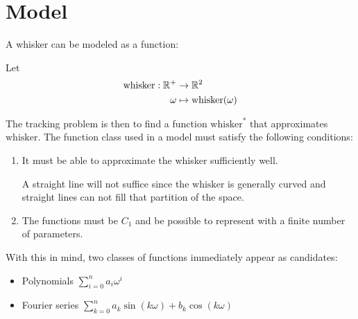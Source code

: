 \section{Model}


A whisker can be modeled as a function:



\begin{definition}
    Let 
    \begin{equation}
    \begin{split}
        \text{whisker} : \mathbb{R}^+ &\rightarrow \mathbb{R}^2 \\
                  \omega&\mapsto \text{whisker}(\omega)
    \end{split}
    \end{equation}
\end{definition}

The tracking problem is then to find a function $\text{whisker}^*$
that approximates $\text{whisker}$. The function class used in a
model must satisfy the following conditions:

\begin{enumerate}
\item It must be able to approximate the whisker sufficiently
  well.

  \begin{example}
    A straight line will not suffice since the $\text{whisker}$ is
    generally curved and straight lines can not fill that partition of
    the space.
  \end{example}
  
\item The functions must be $C_1$ and be possible to represent with a
  finite number of parameters.
\end{enumerate}

With this in mind, two classes of functions immediately appear as
candidates:
\begin{itemize}
\item Polynomials $\sum_{i=0}^{n} a_i\omega^i$
\item Fourier series $\sum_{k=0}^{n} a_k\sin(k\omega) +
  b_k\cos(k\omega)$
\end{itemize}

